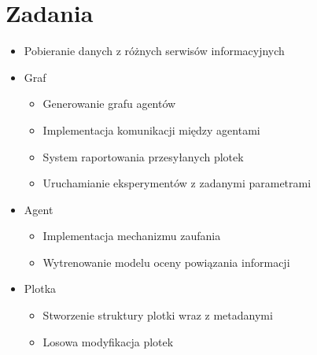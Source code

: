 \documentclass{article}
\begin{document}
	\section{Zadania}
	\begin{itemize}
	\item Pobieranie danych z różnych serwisów informacyjnych
	\item Graf
		\begin{itemize}
		\item Generowanie grafu agentów
		\item Implementacja komunikacji między agentami
		\item System raportowania przesyłanych plotek
		\item Uruchamianie eksperymentów z zadanymi parametrami
		\end{itemize}
	\item Agent
		\begin{itemize}
		\item Implementacja mechanizmu zaufania
		\item Wytrenowanie modelu oceny powiązania informacji
		\end{itemize}
	\item Plotka
		\begin{itemize}
		\item Stworzenie struktury plotki wraz z metadanymi
		\item Losowa modyfikacja plotek
		\end{itemize}
	\end{itemize}
\end{document}
